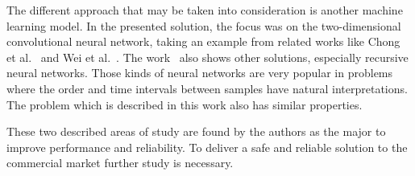 The different approach that may be taken into consideration is another machine learning model.
In the presented solution, the focus was on the two-dimensional convolutional neural network, taking an example from related works like Chong et al.~\cite{Main} and Wei et al.~\cite{a-deep-learning-approach-to-web-bot-detection-using-mouse-behavioral-biometrics}.
The work~\cite{Main} also shows other solutions, especially recursive neural networks.
Those kinds of neural networks are very popular in problems where the order and time intervals between samples have natural interpretations.
The problem which is described in this work also has similar properties.

These two described areas of study are found by the authors as the major to improve performance and reliability.
To deliver a safe and reliable solution to the commercial market further study is necessary.
